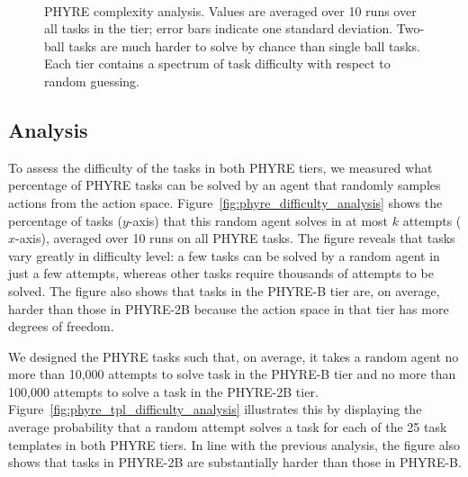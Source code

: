 \documentclass{article}
\begin{document}
\begin{figure*}[!t]\centering
{}
\hspace{6mm}
\\[.25em]
\caption{PHYRE complexity analysis. Values are averaged over 10 runs over all tasks in the tier; error bars indicate one standard deviation. Two-ball tasks are much harder to solve by chance than single ball tasks. Each tier contains a spectrum of task difficulty with respect to random guessing.}
\vspace{-3mm}
\end{figure*}


\subsection{Analysis}
\label{sec:phyre_analysis}
To assess the difficulty of the tasks in both PHYRE tiers, we measured what percentage of PHYRE tasks can be solved by an agent that randomly samples actions from the action space. Figure~\ref{fig:phyre_difficulty_analysis} shows the percentage of tasks ($y$-axis) that this random agent solves in at most $k$ attempts ($x$-axis), averaged over 10 runs on all PHYRE tasks. The figure reveals that tasks vary greatly in difficulty level: a few tasks can be solved by a random agent in just a few attempts, whereas other tasks require thousands of attempts to be solved. The figure also shows that tasks in the PHYRE-B tier are, on average, harder than those in PHYRE-2B because the action space in that tier has more degrees of freedom.

We designed the PHYRE tasks such that, on average, it takes a random agent no more than 10,000 attempts to solve task in the PHYRE-B tier and no more than 100,000 attempts to solve a task in the PHYRE-2B tier. Figure~\ref{fig:phyre_tpl_difficulty_analysis} illustrates this by displaying the average probability that a random attempt solves a task for each of the 25 task templates in both PHYRE tiers. In line with the previous analysis, the figure also shows that tasks in PHYRE-2B are substantially harder than those in PHYRE-B.
 
\end{document}
